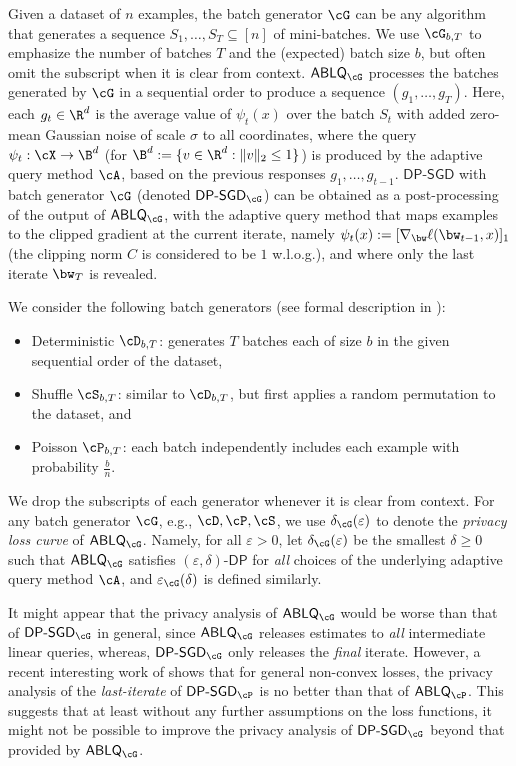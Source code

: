 \documentclass[twoside]{article}
\theoremstyle{definition}
\newcommand{\eps}{\varepsilon}
\newcommand{\DP}{\mathsf{DP}}
\newcommand{\DPSGD}{\mathsf{DP}\text{-}\mathsf{SGD}}
\newcommand{\ABLQ}{\mathsf{ABLQ}}
\newcommand{\DPSGDG}{\DPSGD_{\cG}}
\newcommand{\DPSGDP}{\DPSGD_{\cP}}
\newcommand{\ABLQG}{\ABLQ_{\cG}}
\newcommand{\ABLQP}{\ABLQ_{\cP}}
\newcommand{\epsG}{\eps_{\cG}}
\newcommand{\deltaG}{\delta_{\cG}}
\begin{document}
Given a dataset of $n$ examples, the batch generator $\cG$ can be any algorithm that generates a sequence $S_1, \ldots, S_T \subseteq [n]$ of mini-batches. We use $\cG_{b,T}$ to emphasize the number of batches $T$ and the (expected) batch size $b$, but often omit the subscript when it is clear from context.
$\ABLQG$ processes the batches generated by $\cG$ in a sequential order to produce a sequence $(g_1, \ldots, g_T)$.  Here, each $g_t \in \R^d$ is the average value of $\psi_t(x)$ over the batch $S_t$ with added zero-mean Gaussian noise of scale $\sigma$ to all coordinates, where the query $\psi_t : \cX \to \B^d$ (for $\B^d := \{ v \in \R^d : \|v\|_2 \le 1\}$) is produced by the adaptive query method $\cA$, based on the previous responses $g_1, \ldots, g_{t-1}$.
$\DPSGD$ with batch generator $\cG$ (denoted $\DPSGDG$) can be obtained as a post-processing of the output of $\ABLQG$, with the adaptive query method that maps examples to the clipped gradient at the current iterate, namely $\psi_t(x) := [\nabla_{\bw} \ell(\bw_{t-1}, x)]_1$ (the clipping norm $C$ is considered to be $1$ w.l.o.g.), and where only the last iterate $\bw_T$ is revealed.

We consider the following batch generators (see formal description in ):
\begin{itemize}[topsep=-2pt,itemsep=-2pt]
    \item Deterministic $\cD_{b, T}$:  generates $T$ batches each of size $b$ in the given sequential order of the dataset,
    \item Shuffle $\cS_{b,T}$: similar to $\cD_{b, T}$, but first applies a random permutation to the dataset, and
    \item Poisson $\cP_{b,T}$: each batch independently includes each example with probability $\frac bn$.
\end{itemize}
We drop the subscripts of each generator whenever it is clear from context.
For any batch generator $\cG$, e.g.,  $\cD, \cP, \cS$, we use $\deltaG(\eps)$ to denote the {\em privacy loss curve} of $\ABLQG$. Namely, for all $\eps > 0$, let $\deltaG(\eps)$ be the smallest $\delta \ge 0$ such that $\ABLQG$ satisfies $(\eps, \delta)$-$\DP$ for {\em all} choices of the underlying adaptive query method $\cA$, and $\epsG(\delta)$ is defined similarly.

It might appear that the privacy analysis of $\ABLQG$ would be worse than that of $\DPSGDG$ in general, since $\ABLQG$ releases estimates to {\em all} intermediate linear queries, whereas, $\DPSGDG$ only releases the {\em final} iterate. However, a recent interesting work of \cite{annamalai2024loss} shows that for general non-convex losses, the privacy analysis of the {\em last-iterate} of $\DPSGDP$ is no better than that of $\ABLQP$. This suggests that at least without any further assumptions on the loss functions, it might not be possible to improve the privacy analysis of $\DPSGDG$ beyond that provided by $\ABLQG$.
\end{document}
